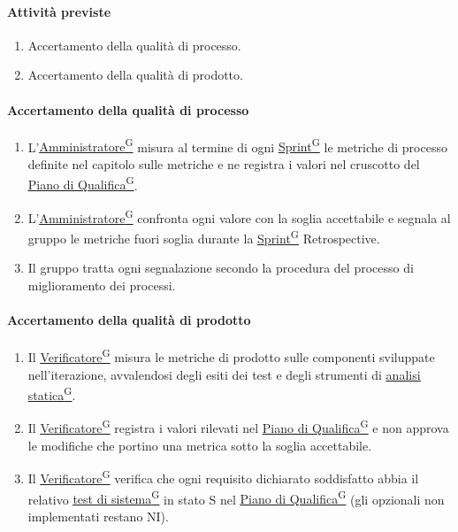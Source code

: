 \documentclass[a4paper,12pt]{article}
\providecommand{\glslink}[2]{\href{https://alittlebyte-19.github.io/Documentazione/glossario.html\#gls-#1}{\underline{#2}\textsuperscript{\scriptsize G}}}
\begin{document}
\paragraph{Attività previste}
\begin{enumerate}
    \item Accertamento della qualità di processo.
    \item Accertamento della qualità di prodotto.
\end{enumerate}

\paragraph{Accertamento della qualità di processo}
\begin{enumerate}
    \item L'\glslink{amministratore}{Amministratore} misura al termine di ogni \glslink{sprint}{Sprint} le metriche di processo definite nel capitolo sulle metriche e ne registra i valori nel cruscotto del \glslink{piano-di-qualifica}{Piano di Qualifica}.
    \item L'\glslink{amministratore}{Amministratore} confronta ogni valore con la soglia accettabile e segnala al gruppo le metriche fuori soglia durante la \glslink{sprint}{Sprint} Retrospective.
    \item Il gruppo tratta ogni segnalazione secondo la procedura del processo di miglioramento dei processi.
\end{enumerate}

\paragraph{Accertamento della qualità di prodotto}
\begin{enumerate}
    \item Il \glslink{verificatore}{Verificatore} misura le metriche di prodotto sulle componenti sviluppate nell'iterazione, avvalendosi degli esiti dei test e degli strumenti di \glslink{analisi-statica}{analisi statica}.
    \item Il \glslink{verificatore}{Verificatore} registra i valori rilevati nel \glslink{piano-di-qualifica}{Piano di Qualifica} e non approva le modifiche che portino una metrica sotto la soglia accettabile.
    \item Il \glslink{verificatore}{Verificatore} verifica che ogni requisito dichiarato soddisfatto abbia il relativo \glslink{test-di-sistema}{test di sistema} in stato S nel \glslink{piano-di-qualifica}{Piano di Qualifica} (gli opzionali non implementati restano NI).
\end{enumerate}
\end{document}
